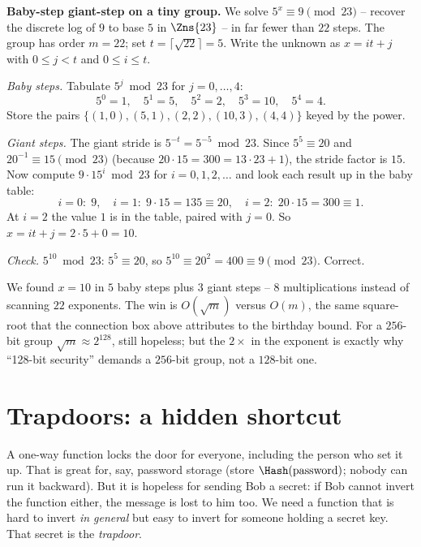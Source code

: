 \begin{labbox}
\textbf{Baby-step giant-step on a tiny group.} We solve $5^{x}\equiv 9 \pmod{23}$ -- recover the discrete log of $9$ to base $5$ in $\Zns{23}$ -- in far fewer than $22$ steps. The group has order $m = 22$; set $t = \lceil\sqrt{22}\rceil = 5$. Write the unknown as $x = it + j$ with $0 \le j < t$ and $0 \le i \le t$.

\emph{Baby steps.} Tabulate $5^{j}\bmod 23$ for $j = 0,\dots,4$:
\[
5^{0}{=}1,\quad 5^{1}{=}5,\quad 5^{2}{=}2,\quad 5^{3}{=}10,\quad 5^{4}{=}4.
\]
Store the pairs $\{(1,0),(5,1),(2,2),(10,3),(4,4)\}$ keyed by the power.

\emph{Giant steps.} The giant stride is $5^{-t} = 5^{-5}\bmod 23$. Since $5^{5}\equiv 20$ and $20^{-1}\equiv 15 \pmod{23}$ (because $20\cdot 15 = 300 = 13\cdot 23 + 1$), the stride factor is $15$. Now compute $9\cdot 15^{i}\bmod 23$ for $i=0,1,2,\dots$ and look each result up in the baby table:
\[
i{=}0:\;9,\quad i{=}1:\;9\cdot 15 = 135 \equiv 20,\quad i{=}2:\;20\cdot 15 = 300 \equiv 1.
\]
At $i=2$ the value $1$ is in the table, paired with $j=0$. So $x = it + j = 2\cdot 5 + 0 = 10$.

\emph{Check.} $5^{10}\bmod 23$: $5^{5}\equiv 20$, so $5^{10}\equiv 20^{2} = 400 \equiv 9 \pmod{23}$. Correct.

We found $x=10$ in $5$ baby steps plus $3$ giant steps -- $8$ multiplications instead of scanning $22$ exponents. The win is $O(\sqrt m)$ versus $O(m)$, the same square-root that the connection box above attributes to the birthday bound. For a $256$-bit group $\sqrt m \approx 2^{128}$, still hopeless; but the $2\times$ in the exponent is exactly why ``128-bit security'' demands a $256$-bit group, not a $128$-bit one.
\end{labbox}

\section{Trapdoors: a hidden shortcut}
\label{ch08:trapdoor}

A one-way function locks the door for everyone, including the person who set it up. That is great for, say, password storage (store $\Hash(\text{password})$; nobody can run it backward). But it is hopeless for sending Bob a secret: if Bob cannot invert the function either, the message is lost to him too. We need a function that is hard to invert \emph{in general} but easy to invert for someone holding a secret key. That secret is the \emph{trapdoor}.

